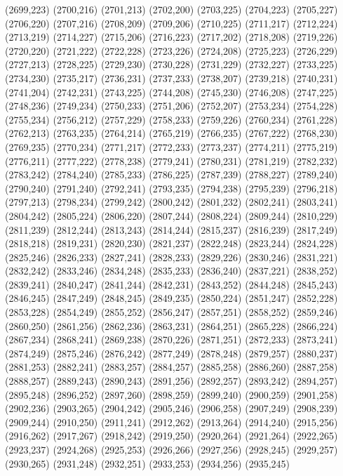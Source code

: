 (2699,223)
(2700,216)
(2701,213)
(2702,200)
(2703,225)
(2704,223)
(2705,227)
(2706,220)
(2707,216)
(2708,209)
(2709,206)
(2710,225)
(2711,217)
(2712,224)
(2713,219)
(2714,227)
(2715,206)
(2716,223)
(2717,202)
(2718,208)
(2719,226)
(2720,220)
(2721,222)
(2722,228)
(2723,226)
(2724,208)
(2725,223)
(2726,229)
(2727,213)
(2728,225)
(2729,230)
(2730,228)
(2731,229)
(2732,227)
(2733,225)
(2734,230)
(2735,217)
(2736,231)
(2737,233)
(2738,207)
(2739,218)
(2740,231)
(2741,204)
(2742,231)
(2743,225)
(2744,208)
(2745,230)
(2746,208)
(2747,225)
(2748,236)
(2749,234)
(2750,233)
(2751,206)
(2752,207)
(2753,234)
(2754,228)
(2755,234)
(2756,212)
(2757,229)
(2758,233)
(2759,226)
(2760,234)
(2761,228)
(2762,213)
(2763,235)
(2764,214)
(2765,219)
(2766,235)
(2767,222)
(2768,230)
(2769,235)
(2770,234)
(2771,217)
(2772,233)
(2773,237)
(2774,211)
(2775,219)
(2776,211)
(2777,222)
(2778,238)
(2779,241)
(2780,231)
(2781,219)
(2782,232)
(2783,242)
(2784,240)
(2785,233)
(2786,225)
(2787,239)
(2788,227)
(2789,240)
(2790,240)
(2791,240)
(2792,241)
(2793,235)
(2794,238)
(2795,239)
(2796,218)
(2797,213)
(2798,234)
(2799,242)
(2800,242)
(2801,232)
(2802,241)
(2803,241)
(2804,242)
(2805,224)
(2806,220)
(2807,244)
(2808,224)
(2809,244)
(2810,229)
(2811,239)
(2812,244)
(2813,243)
(2814,244)
(2815,237)
(2816,239)
(2817,249)
(2818,218)
(2819,231)
(2820,230)
(2821,237)
(2822,248)
(2823,244)
(2824,228)
(2825,246)
(2826,233)
(2827,241)
(2828,233)
(2829,226)
(2830,246)
(2831,221)
(2832,242)
(2833,246)
(2834,248)
(2835,233)
(2836,240)
(2837,221)
(2838,252)
(2839,241)
(2840,247)
(2841,244)
(2842,231)
(2843,252)
(2844,248)
(2845,243)
(2846,245)
(2847,249)
(2848,245)
(2849,235)
(2850,224)
(2851,247)
(2852,228)
(2853,228)
(2854,249)
(2855,252)
(2856,247)
(2857,251)
(2858,252)
(2859,246)
(2860,250)
(2861,256)
(2862,236)
(2863,231)
(2864,251)
(2865,228)
(2866,224)
(2867,234)
(2868,241)
(2869,238)
(2870,226)
(2871,251)
(2872,233)
(2873,241)
(2874,249)
(2875,246)
(2876,242)
(2877,249)
(2878,248)
(2879,257)
(2880,237)
(2881,253)
(2882,241)
(2883,257)
(2884,257)
(2885,258)
(2886,260)
(2887,258)
(2888,257)
(2889,243)
(2890,243)
(2891,256)
(2892,257)
(2893,242)
(2894,257)
(2895,248)
(2896,252)
(2897,260)
(2898,259)
(2899,240)
(2900,259)
(2901,258)
(2902,236)
(2903,265)
(2904,242)
(2905,246)
(2906,258)
(2907,249)
(2908,239)
(2909,244)
(2910,250)
(2911,241)
(2912,262)
(2913,264)
(2914,240)
(2915,256)
(2916,262)
(2917,267)
(2918,242)
(2919,250)
(2920,264)
(2921,264)
(2922,265)
(2923,237)
(2924,268)
(2925,253)
(2926,266)
(2927,256)
(2928,245)
(2929,257)
(2930,265)
(2931,248)
(2932,251)
(2933,253)
(2934,256)
(2935,245)
